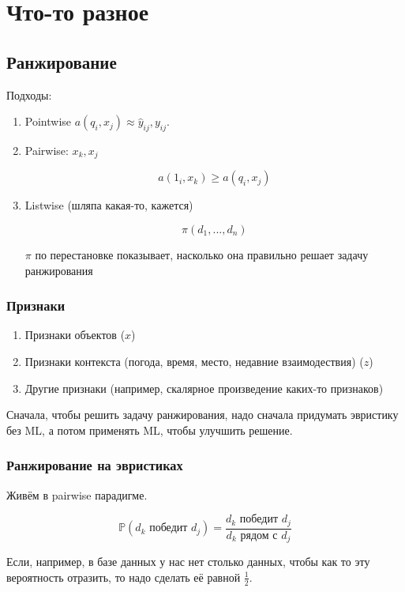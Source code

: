 \documentclass[12pt]{article}
\begin{document}
\section*{Что-то разное}

\subsection*{Ранжирование}

Подходы:

\begin{enumerate}
\item Pointwise $a(q_i, x_j) \approx \hat{y}_{ij}, y_{ij}$.
\item Pairwise:
$x_k, x_j$

\[ a(1_i, x_k) \geq a(q_i, x_j) \]

\item Listwise (шляпа какая-то, кажется)

\[ \pi(d_1, ..., d_n) \]

$\pi$ по перестановке показывает, насколько она правильно решает задачу ранжирования

\end{enumerate}

\subsubsection*{Признаки}

\begin{enumerate}
\item Признаки объектов ($x$)
\item Признаки контекста (погода, время, место, недавние взаимодествия) ($z$)
\item Другие признаки (например, скалярное произведение каких-то признаков)
\end{enumerate}

Сначала, чтобы решить задачу ранжирования, надо сначала придумать эвристику без ML, а потом применять ML, чтобы улучшить решение.

\subsubsection*{Ранжирование на эвристиках}

Живём в pairwise парадигме.

\[ \mathbb{P}(d_k \text{  победит  } d_j) = \frac{d_k \text{  победит  } d_j} {d_k \text{  рядом с  } d_j}\]

Если, например, в базе данных у нас нет столько данных, чтобы как то эту вероятность отразить, то надо сделать её равной $\frac{1}{2}$.
\end{document}
